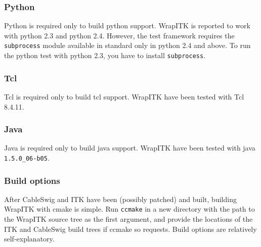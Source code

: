 \documentclass{InsightArticle}
\begin{document}
    \subsubsection{Python}

Python \cite{PythonWebSite} is required only to build python support.
WrapITK is reported to work with python 2.3 and python 2.4. However, the test framework
requires the \verb$subprocess$ module available in standard only in python 2.4 and above.
To run the python test with python 2.3, you have to install \verb$subprocess$.

    \subsubsection{Tcl}

Tcl \cite{TclWebSite} is required only to build tcl support.
WrapITK have been tested with Tcl 8.4.11.

    \subsubsection{Java}

Java \cite{JavaWebSite} is required only to build java support.
WrapITK have been tested with java \verb$1.5.0_06-b05$.

    \subsubsection{Build options}

After CableSwig and ITK have been (possibly patched) and built, building WrapITK
with cmake is simple. Run \verb$ccmake$ in a new directory with the path to the WrapITK
source tree as the first argument, and provide the locations of the ITK and
CableSwig build trees if ccmake so requests. Build options are relatively
self-explanatory.
\end{document}
